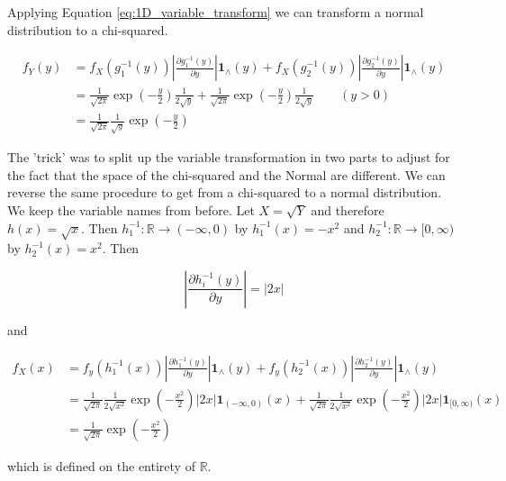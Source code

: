 Applying Equation \ref{eq:1D_variable_transform} we can transform a normal distribution to a chi-squared.

\begin{align}
	f_Y(y) &= f_X(g_1^{-1}(y))	\left\vert\frac{\partial g_1^{-1}(y)}{\partial y} \right\vert \mathbf{1}_\wedge(y) + f_X(g_2^{-1}(y))	\left\vert\frac{\partial g_2^{-1}(y)}{\partial y} \right\vert \mathbf{1}_\wedge(y) \nonumber\\
	&= \frac{1}{\sqrt{2\pi}} \exp(-\frac{y}{2}) \frac{1}{2\sqrt{y}} + \frac{1}{\sqrt{2\pi}} \exp(-\frac{y}{2}) \frac{1}{2\sqrt{y}} \qquad(y > 0)\\
	&= \frac{1}{\sqrt{2\pi}} \frac{1}{\sqrt{y}}\exp(-\frac{y}{2}) \nonumber
\end{align}

The 'trick' was to split up the variable transformation in two parts to adjust for the fact that the space of the chi-squared and the Normal are different. We can reverse the same procedure to get from a chi-squared to a normal distribution. We keep the variable names from before. Let $X = \sqrt{Y}$ and therefore $h(x) = \sqrt{x}$. Then $h_1^{-1}: \mathbb{R} \rightarrow (-\infty, 0)$ by $h_1^{-1}(x) = -x^2$ and $h_2^{-1}: \mathbb{R} \rightarrow [0, \infty)$ by $h_2^{-1}(x) = x^2$. Then

$$\left\vert\frac{\partial h_i^{-1}(y)}{\partial y} \right\vert = \vert 2x \vert $$

and
 
\begin{align}
	f_X(x) &= f_y(h_1^{-1}(x)) \left\vert\frac{\partial h_1^{-1}(y)}{\partial y} \right\vert \mathbf{1}_\wedge(y) + f_y(h_2^{-1}(x)) \left\vert\frac{\partial h_2^{-1}(y)}{\partial y} \right\vert \mathbf{1}_\wedge(y) \nonumber \\
	&= \frac{1}{\sqrt{2\pi}} \frac{1}{2\sqrt{x^2}} \exp(-\frac{x^2}{2}) |2x| \mathbf{1}_{(-\infty, 0)}(x) + \frac{1}{\sqrt{2\pi}} \frac{1}{2\sqrt{x^2}} \exp(-\frac{x^2}{2}) |2x| \mathbf{1}_{[0, \infty)}(x) \\
	&= \frac{1}{\sqrt{2\pi}} \exp(-\frac{x^2}{2}) \nonumber
\end{align}

which is defined on the entirety of $\mathbb{R}$.